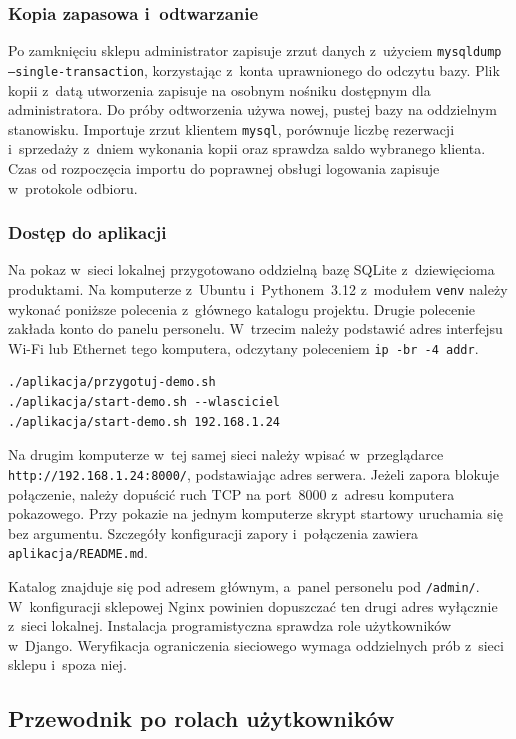 \documentclass[12pt,a4paper,oneside]{article}
\newcounter{pu}
\begin{document}
\subsubsection{Kopia zapasowa i~odtwarzanie}

Po zamknięciu sklepu administrator zapisuje zrzut danych z~użyciem \texttt{mysqldump --single-transaction}, korzystając z~konta uprawnionego do odczytu bazy. Plik kopii z~datą utworzenia zapisuje na osobnym nośniku dostępnym dla administratora. Do próby odtworzenia używa nowej, pustej bazy na oddzielnym stanowisku. Importuje zrzut klientem \texttt{mysql}, porównuje liczbę rezerwacji i~sprzedaży z~dniem wykonania kopii oraz sprawdza saldo wybranego klienta. Czas od rozpoczęcia importu do poprawnej obsługi logowania zapisuje w~protokole odbioru.


\subsubsection{Dostęp do aplikacji}

Na pokaz w~sieci lokalnej przygotowano oddzielną bazę SQLite z~dziewięcioma produktami. Na komputerze z~Ubuntu i~Pythonem~3.12 z~modułem \texttt{venv} należy wykonać poniższe polecenia z~głównego katalogu projektu. Drugie polecenie zakłada konto do panelu personelu. W~trzecim należy podstawić adres interfejsu Wi-Fi lub Ethernet tego komputera, odczytany poleceniem \texttt{ip -br -4 addr}.

\begin{verbatim}
./aplikacja/przygotuj-demo.sh
./aplikacja/start-demo.sh --wlasciciel
./aplikacja/start-demo.sh 192.168.1.24
\end{verbatim}

Na drugim komputerze w~tej samej sieci należy wpisać w~przeglądarce \nolinkurl{http://192.168.1.24:8000/}, podstawiając adres serwera. Jeżeli zapora blokuje połączenie, należy dopuścić ruch TCP na port~8000 z~adresu komputera pokazowego. Przy pokazie na jednym komputerze skrypt startowy uruchamia się bez argumentu. Szczegóły konfiguracji zapory i~połączenia zawiera \texttt{aplikacja/README.md}.

Katalog znajduje się pod adresem głównym, a~panel personelu pod \texttt{/admin/}. W~konfiguracji sklepowej Nginx powinien dopuszczać ten drugi adres wyłącznie z~sieci lokalnej. Instalacja programistyczna sprawdza role użytkowników w~Django. Weryfikacja ograniczenia sieciowego wymaga oddzielnych prób z~sieci sklepu i~spoza niej.


\subsection{Przewodnik po rolach użytkowników}
\label{sec:przewodnik}
\end{document}
